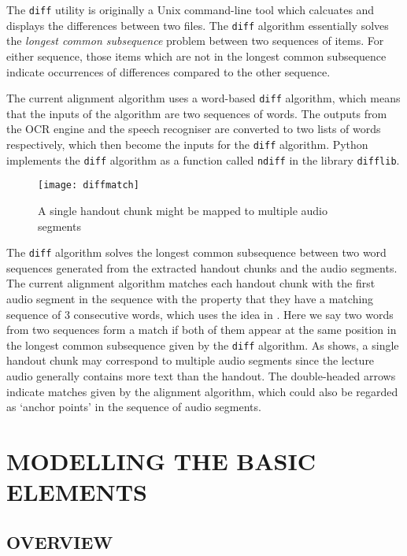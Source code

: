 \documentclass[12pt]{article}
\begin{document}
The \texttt{diff} utility is originally a Unix command-line tool which calcuates and displays the differences between two files. The \texttt{diff} algorithm essentially solves the \textit{longest common subsequence} problem between two sequences of items. For either sequence, those items which are not in the longest common subsequence indicate occurrences of differences compared to the other sequence.

The current alignment algorithm uses a word-based \texttt{diff} algorithm, which means that the inputs of the algorithm are two sequences of words. The outputs from the OCR engine and the speech recogniser are converted to two lists of words respectively, which then become the inputs for the \texttt{diff} algorithm. Python implements the \texttt{diff} algorithm as a function called \texttt{ndiff} in the library \texttt{difflib}.

\begin{figure}[!htb]
    \centering
    \texttt{[image: diffmatch]}
    \caption{A single handout chunk might be mapped to multiple audio segments}
    \label{fig:diffmatch}
\end{figure}

The \texttt{diff} algorithm solves the longest common subsequence between two word sequences generated from the extracted handout chunks and the audio segments. The current alignment algorithm matches each handout chunk with the first audio segment in the sequence with the property that they have a matching sequence of 3 consecutive words, which uses the idea in \cite{diffref}. Here we say two words from two sequences form a match if both of them appear at the same position in the longest common subsequence given by the \texttt{diff} algorithm. As  shows, a single handout chunk may correspond to multiple audio segments since the lecture audio generally contains more text than the handout. The double-headed arrows indicate matches given by the alignment algorithm, which could also be regarded as `anchor points' in the sequence of audio segments.


\section{MODELLING THE BASIC ELEMENTS}
\label{sec:basic-elems}

\subsection{OVERVIEW}
\end{document}

